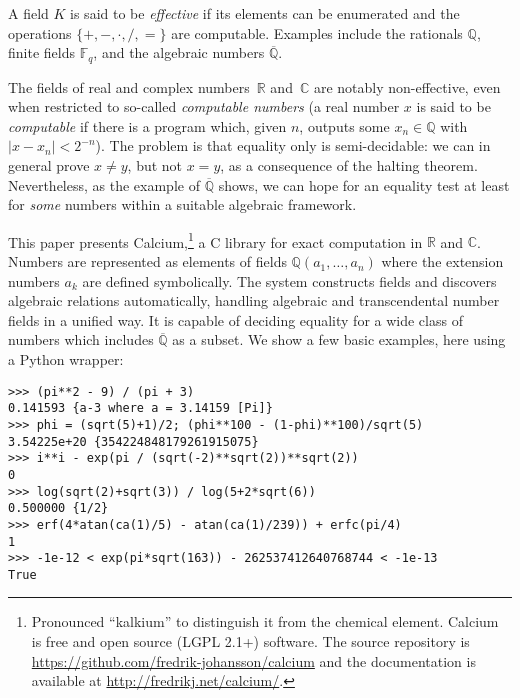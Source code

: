 \documentclass[sigconf,screen,urlbreakonhyphens]{acmart}
\begin{document}
A field $K$ is said to be \emph{effective}
if its elements can be enumerated
and the operations $\{+, -, \cdot, /, =\}$
are computable.
Examples include the rationals $\mathbb{Q}$, finite fields $\mathbb{F}_q$,
and the algebraic numbers $\overline{\mathbb{Q}}$.

The fields of real and complex numbers~$\mathbb{R}$ and~$\mathbb{C}$
are notably non-effective, even 
when restricted to so-called \emph{computable numbers}
(a real number $x$ is said to be \emph{computable} if
there is a program
which, given $n$, outputs some $x_n \in \mathbb{Q}$ with $|x - x_n| < 2^{-n}$).
The problem is that equality only is semi-decidable: we can in general prove $x \ne y$,
but not $x = y$, as a consequence of the halting theorem.
Nevertheless,
as the example of $\overline{\mathbb{Q}}$ shows,
we can hope for an equality test at least for \emph{some} numbers
within a suitable algebraic framework.

This paper presents Calcium,\footnote{Pronounced ``kalkium'' to distinguish it from
the chemical element. Calcium is free and open source
(LGPL 2.1+) software. The source repository is
\url{https://github.com/fredrik-johansson/calcium} and
the documentation is available at \url{http://fredrikj.net/calcium/}.} a C library
for exact computation in $\mathbb{R}$ and $\mathbb{C}$.
Numbers are represented as elements of fields
$\mathbb{Q}(a_1,\ldots,a_n)$ where the extension numbers $a_k$
are defined symbolically.
The system constructs fields and discovers algebraic relations
automatically,
handling algebraic and transcendental number fields in a unified way.
It is capable of deciding equality
for a wide class of numbers
which includes $\overline{\mathbb{Q}}$ as a subset.
We show a few basic examples, here using a Python wrapper:

\begin{small}
\begin{verbatim}
>>> (pi**2 - 9) / (pi + 3)
0.141593 {a-3 where a = 3.14159 [Pi]}
>>> phi = (sqrt(5)+1)/2; (phi**100 - (1-phi)**100)/sqrt(5)
3.54225e+20 {354224848179261915075}
>>> i**i - exp(pi / (sqrt(-2)**sqrt(2))**sqrt(2))
0
>>> log(sqrt(2)+sqrt(3)) / log(5+2*sqrt(6))
0.500000 {1/2}
>>> erf(4*atan(ca(1)/5) - atan(ca(1)/239)) + erfc(pi/4)
1
>>> -1e-12 < exp(pi*sqrt(163)) - 262537412640768744 < -1e-13
True
\end{verbatim}
\end{small}

\end{document}
